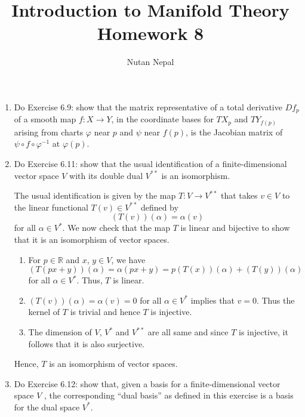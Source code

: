 \documentclass[12pt]{article}
\title{\textbf{Introduction to Manifold Theory} \\
\large Homework 8
}
\author{Nutan Nepal}
\newcommand{\rl}{\mathbb{R}}
\newcommand{\al}{\alpha}
\begin{document}
\maketitle
\makebox[\linewidth]{\rule{200mm}{1pt}}
\vspace{1mm}

\begin{enumerate}

\item Do Exercise 6.9: show that the matrix representative
of a total derivative $Df_p$ of a smooth map $f : X\to Y$,
in the coordinate bases for $TX_p$ and $TY_{f(p)}$
arising from charts $\varphi$ near $p$ and $\psi$ near
$f(p)$, is the Jacobian matrix of
$\psi\circ f\circ\varphi^{-1}$ at $\varphi(p)$.

\begin{mybox}


\end{mybox}

\item Do Exercise 6.11: show that the usual identification
of a finite-dimensional vector
space $V$ with its double dual $V^{**}$ is an isomorphism.
\begin{mybox}
    
    The usual identification is given by the map $T:V\to
    V^{**}$ that takes $v\in V$ to the linear functional
    $T(v)\in V^{**}$ defined by
    $$(T(v))(\alpha)=\alpha(v)$$
    for all $\alpha\in V^*$. We now check that the map
    $T$ is linear and bijective to show that it is an
    isomorphism of vector spaces.
    \begin{enumerate}
        \item For $p\in\rl$ and $x$, $y\in V$, we have
            $(T(px+y))(\al)=\al(px+y)=p(T(x))(\al)+(T(y))
            (\al)$ for all $\al\in V^*$. Thus, $T$ is linear.

        \item $(T(v))(\al)=\al(v)=0$ for all $\al\in V^*$
            implies that $v=0$. Thus the kernel of $T$
            is trivial and hence $T$ is injective.

        \item The dimension of $V$, $V^*$ and $V^{**}$ are
            all same and since $T$ is injective, it follows
            that it is also surjective.
    \end{enumerate}
    Hence, $T$ is an isomorphism of vector spaces.
\end{mybox}

\item Do Exercise 6.12: show that, given a basis for a
finite-dimensional vector space $V$ ,
the corresponding “dual basis” as defined in this
exercise is a basis for the dual space $V^*$.


\end{enumerate}
\end{document}

